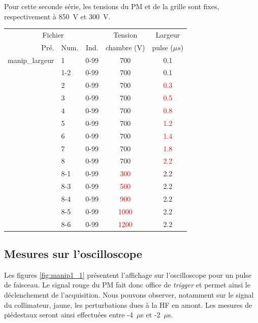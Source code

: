 \documentclass[a4paper,11pt]{article}
\begin{document}
\newpage
Pour cette seconde série, les tensions du PM et de la grille sont fixes, respectivement à 850~V et 300~V.
\begin{center}
\begin{tabular}{rlccc}
\multicolumn{3}{c}{Fichier}&Tension&Largeur\\
Pré.&Num.&Ind.&chambre (V)&pulse ($\mu s$)\\
\hline
\hline
manip\_largeur&1&0-99&700&0.1\\
&1-2&0-99&700&0.1\\
&2&0-99&700&\textcolor{red}{0.3}\\
&3&0-99&700&\textcolor{red}{0.5}\\
&4&0-99&700&\textcolor{red}{0.8}\\
&5&0-99&700&\textcolor{red}{1.2}\\
&6&0-99&700&\textcolor{red}{1.4}\\
&7&0-99&700&\textcolor{red}{1.8}\\
&8&0-99&700&\textcolor{red}{2.2}\\
&8-1&0-99&\textcolor{red}{300}&2.2\\
&8-3&0-99&\textcolor{red}{500}&2.2\\
&8-4&0-99&\textcolor{red}{900}&2.2\\
&8-5&0-99&\textcolor{red}{1000}&2.2\\
&8-6&0-99&\textcolor{red}{1200}&2.2\\
\hline
\end{tabular}
\end{center}

\subsection*{Mesures sur l'oscilloscope}

Les figures \ref{fig:manip1_1} présentent l'affichage sur l'oscilloscope pour un pulse de faisceau. 
Le signal rouge du PM fait donc office de \emph{trigger} et permet ainsi le déclenchement de l'acquisition.
Nous pouvons observer, notamment sur le signal du collimateur, jaune, les perturbations dues à la HF en amont.
Les mesures de piédestaux seront ainsi effectuées entre -4~$\mu$s et -2~$\mu$s.
\end{document}
